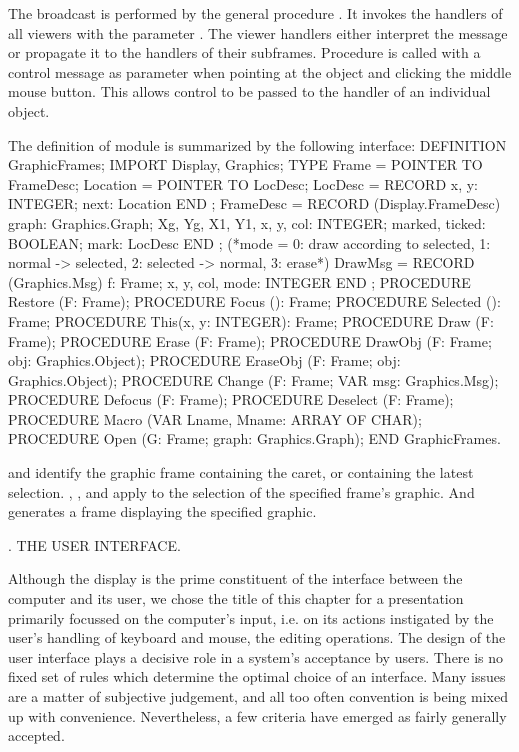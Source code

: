 The broadcast is performed by the general procedure . It invokes the handlers of all viewers with the parameter . The viewer handlers either interpret the message or propagate it to the handlers of their subframes. Procedure  is called with a control message as parameter when pointing at the object and clicking the middle mouse button. This allows control to be passed to the handler of an individual object.

The definition of module  is summarized by the following interface:
\begintt
DEFINITION GraphicFrames;
IMPORT Display, Graphics;
TYPE Frame = POINTER TO FrameDesc; Location = POINTER TO LocDesc;
LocDesc = RECORD x, y: INTEGER; next: Location
END ;
FrameDesc = RECORD (Display.FrameDesc) graph: Graphics.Graph;
Xg, Yg, X1, Y1, x, y, col: INTEGER; marked, ticked: BOOLEAN;
mark: LocDesc END ;
(*mode = 0: draw according to selected, 1: normal -> selected, 2: selected -> normal, 3: erase*)
DrawMsg = RECORD (Graphics.Msg) f: Frame;
x, y, col, mode: INTEGER
END ;
PROCEDURE Restore (F: Frame);
PROCEDURE Focus (): Frame;
PROCEDURE Selected (): Frame;
PROCEDURE This(x, y: INTEGER): Frame;
PROCEDURE Draw (F: Frame);
PROCEDURE Erase (F: Frame);
PROCEDURE DrawObj (F: Frame; obj: Graphics.Object); PROCEDURE EraseObj (F: Frame; obj: Graphics.Object); PROCEDURE Change (F: Frame; VAR msg: Graphics.Msg); PROCEDURE Defocus (F: Frame);
PROCEDURE Deselect (F: Frame);
PROCEDURE Macro (VAR Lname, Mname: ARRAY OF CHAR);
PROCEDURE Open (G: Frame; graph: Graphics.Graph); END GraphicFrames.
\endtt

 and  identify the graphic frame containing the caret, or containing the latest selection. , , and  apply to the selection of the specified frame's graphic. And  generates a frame displaying the specified graphic.

. THE USER INTERFACE.

Although the display is the prime constituent of the interface between the computer and its user, we chose the title of this chapter for a presentation primarily focussed on the computer's input, i.e. on its actions instigated by the user's handling of keyboard and mouse, the editing operations. The design of the user interface plays a decisive role in a system's acceptance by users. There is no fixed set of rules which determine the optimal choice of an interface. Many issues are a matter of subjective judgement, and all too often convention is being mixed up with convenience. Nevertheless, a few criteria have emerged as fairly generally accepted.

